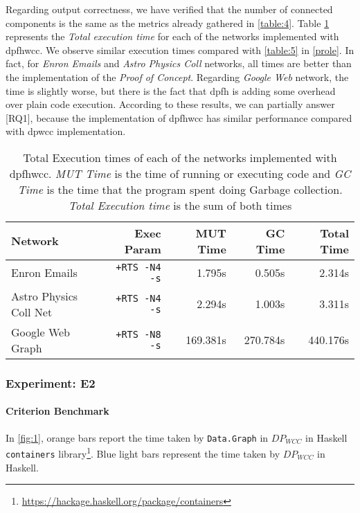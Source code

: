 Regarding output correctness, we have verified that the number of connected components is the same as the metrics already gathered in \autoref{table:4}.
Table \ref{table:new:wcc:dpfh:5} represents the \emph{Total execution time} for each of the networks implemented with \acrshort{dpfhwcc}. We observe similar execution times compared with \autoref{table:5} in \autoref{prole}.
In fact, for \textit{Enron Emails} and \textit{Astro Physics Coll} networks, all times are better than the implementation of the \textit{Proof of Concept}.
Regarding \textit{Google Web} network, the time is slightly worse, but there is the fact that \acrshort{dpfh} is adding some overhead over plain code execution.
According to these results, we can partially answer [RQ1], because the implementation of \acrshort{dpfhwcc} has similar performance compared with \acrshort{dpwcc} implementation. 
 
\begin{table}[H]
  \centering
  \begin{tabular}{|l|r|r|r|r|}
   \hline
   \textbf{Network} & \textbf{Exec Param} & \textbf{MUT Time} & \textbf{GC Time} & \textbf{Total Time}\\
   \hline
   Enron Emails & \texttt{+RTS -N4 -s} & 1.795s & 0.505s & 2.314s \\
   \hline
   Astro Physics Coll Net & \texttt{+RTS -N4 -s} & 2.294s & 1.003s & 3.311s \\
   \hline
   Google Web Graph & \texttt{+RTS -N8 -s} & 169.381s & 270.784s & 440.176s \\
   \hline
  \end{tabular}
 \caption{Total Execution times of each of the networks implemented with \acrshort{dpfhwcc}. \textit{MUT Time} is the time of running or executing code and \textit{GC Time} is the time that the program spent doing Garbage collection. \textit{Total Execution time} is the sum of both times}
 \label{table:new:wcc:dpfh:5}
 \end{table}



\subsubsection{Experiment: E2}\label{sub:new:exp:2}
\paragraph{Criterion Benchmark}
In \autoref{fig:1}, orange bars report the time taken by \texttt{Data.Graph} in $DP_{WCC}$ in Haskell \texttt{containers} library\footnote{\url{https://hackage.haskell.org/package/containers}}. Blue light bars represent the time taken by $DP_{WCC}$ in Haskell.

